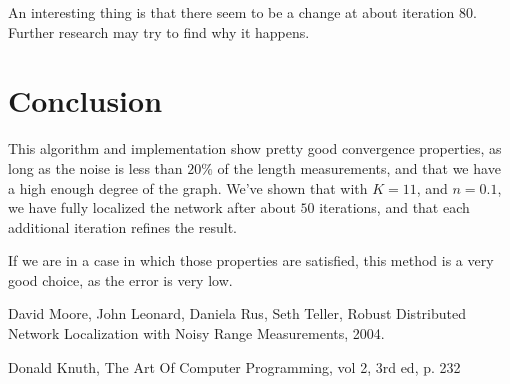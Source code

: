 \documentclass[letterpaper, 10 pt, conference]{ieeeconf}  %
\begin{document}
An interesting thing is that there seem to be a change at about iteration $80$. Further research may try to find why it happens.


\section{Conclusion}

This algorithm and implementation show pretty good convergence properties, as long as the noise is less than $20\%$ of the length measurements, and that we have a high enough degree of the graph. We've shown that with $K=11$, and $n=0.1$, we have fully localized the network after about $50$ iterations, and that each additional iteration refines the result.

If we are in a case in which those properties are satisfied, this method is a very good choice, as the error is very low.

\begin{thebibliography}{99}

 David Moore, John Leonard, Daniela Rus, Seth Teller, Robust Distributed Network Localization with Noisy Range Measurements, 2004.

 Donald Knuth, The Art Of Computer Programming, vol 2, 3rd ed, p. 232





\end{thebibliography}
\end{document}
